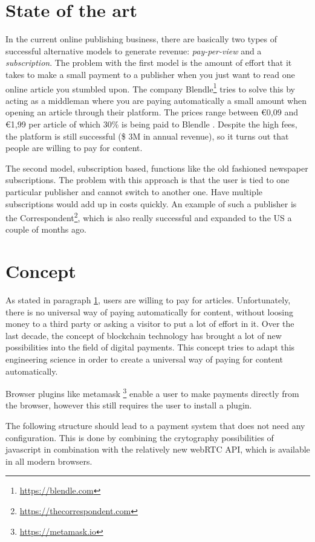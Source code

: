 \documentclass[a4paper]{article}
\begin{document}
\section{State of the art}
\label{stateoftheart}
In the current online publishing business, there are basically two types of successful alternative models to generate revenue: \textit{pay-per-view }and a \textit{subscription}. The problem with the first model is the amount of effort that it takes to make a small payment to a publisher when you just want to read one online article you stumbled upon. The company Blendle\footnote{\url{https://blendle.com}} tries to solve this by acting as a middleman where you are paying automatically a small amount when opening an article through their platform. The prices range between €0,09 and €1,99 per article of which 30\% is being paid to Blendle . Despite the high fees, the platform is still successful (\$ 3M in annual revenue), so it turns out that people are willing to pay for content.

The second model, subscription based, functions like the old fashioned newspaper subscriptions. The problem with this approach is that the user is tied to one particular publisher and cannot switch to another one. Have multiple subscriptions would add up in costs quickly. An example of such a publisher is the Correspondent\footnote{\url{https://thecorrespondent.com}}, which is also really successful and expanded to the US a couple of months ago.

\section {Concept}
As stated in paragraph \ref{stateoftheart}, users are willing to pay for articles. Unfortunately, there is no universal way of paying automatically for content, without loosing money to a third party or asking a visitor to put a lot of effort in it. Over the last decade, the concept of blockchain technology has brought a lot of new possibilities into the field of digital payments. This concept tries to adapt this engineering science in order to create a universal way of paying for content automatically.

Browser plugins like metamask \footnote{\url{https://metamask.io}} enable a user to make payments directly from the browser, however this still requires the user to install a plugin.

The following structure should lead to a payment system that does not need any configuration. This is done by combining the crytography possibilities of javascript in combination with the relatively new webRTC API, which is available in all modern browsers.
\end{document}
